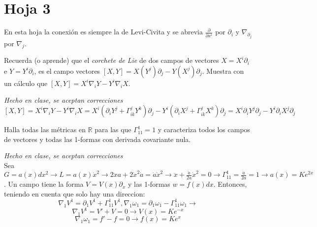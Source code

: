 \section{Hoja 3}
{\footnotesize En esta hoja la conexión es siempre la de Levi-Civita y se abrevia $\frac{\partial}{\partial x^i}$ por $\partial_i$ y  $\nabla_{\partial_j}$ por $\nabla_{j}$.}
\begin{problem}[1] Recuerda (o aprende) que el \emph{corchete de Lie}
	de dos campos de vectores $X=X^i\partial_i$ e $Y=Y^i\partial_i$, es el campo vectores
	$
	[X,Y]= 
	X(Y^j)\partial_j-Y(X^j)\partial_j$.
	Muestra con un cálculo que $[X,Y]= X^i\nabla_iY-Y^i\nabla_iX$.
	
	\solution\textit{Hecho en clase, se aceptan correcciones}\\ $$[X,Y]=X^i\nabla_iY-Y^i\nabla_iX=X^i(\partial_iY^j+\Gamma^j_{ik}Y^k)\partial_j-Y^i(\partial_iX^j+\Gamma^j_{ik}X^k)\partial_j=X^i\partial_iY^j\partial_j-Y^i\partial_iX^j\partial_j$$
	
\end{problem}
\begin{problem}[3] Halla todas las métricas en  $ℝ$ para las que $\Gamma_{11}^1=1$ y caracteriza todos los campos de vectores y todas las 1-formas con derivada covariante nula. 
	
	\solution\textit{Hecho en clase, se aceptan correcciones}\\ Sea $G=a(x)dx^2\longrightarrow L=a(x)\dot{x}^2\longrightarrow2\ddot{x}a+2\dot{x}^2\dot{a}=\dot{a}\dot{x}^2\longrightarrow\ddot{x}+\frac{\dot{a}}{2a}\dot{x}^2=0\longrightarrow\Gamma^1_{11}=\frac{\dot{a}}{2a}=1\longrightarrow a(x)=Ke^{2x}$. Un campo tiene la forma $V =V(x)\partial_x$ y las 1-formas $w = f (x)dx$. Entonces, teniendo en cuenta que solo hay una direccion: $$\nabla_1V^1=\partial_1V^1+\Gamma^1_11V^1,\nabla_1\omega_1=\partial_1\omega_1-\Gamma^1_{11}\omega_1\longrightarrow$$ $$\nabla_1V^1=V'+V=0\longrightarrow V(x)=Ke^{-x}$$ $$\nabla_1\omega_1=f'-f=0\longrightarrow f(x)=Ke^{x}$$
	
\end{problem}

